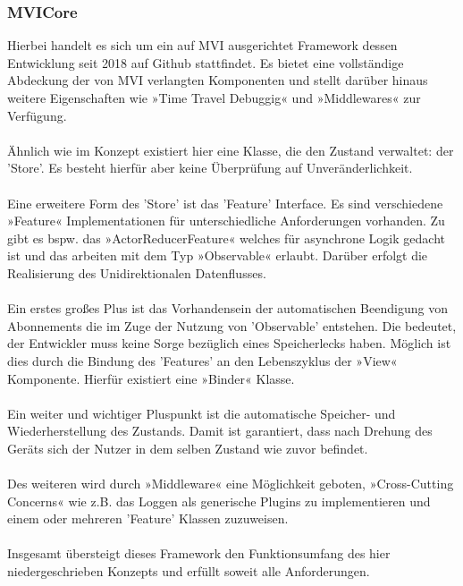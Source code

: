 \subsubsection{MVICore}
\label{subsubsec:mvicore}
Hierbei handelt es sich um ein auf MVI ausgerichtet Framework dessen Entwicklung seit 2018 auf Github stattfindet.
\cite{mviCoreGithub}
Es bietet eine vollständige Abdeckung der von MVI verlangten Komponenten und stellt darüber hinaus weitere Eigenschaften wie »Time Travel Debuggig« und »Middlewares« zur Verfügung.
\\\\
Ähnlich wie im Konzept existiert hier eine Klasse, die den Zustand verwaltet: der 'Store'. Es besteht hierfür aber keine Überprüfung auf Unveränderlichkeit. 
\\\\
Eine erweitere Form des 'Store' ist das 'Feature' Interface. Es sind verschiedene »Feature« Implementationen für unterschiedliche Anforderungen vorhanden. Zu gibt es bspw. das »ActorReducerFeature« welches für asynchrone Logik gedacht ist und das arbeiten mit dem Typ »Observable« erlaubt. Darüber erfolgt die Realisierung des Unidirektionalen Datenflusses.
\\\\
Ein erstes großes Plus ist das Vorhandensein der automatischen Beendigung von Abonnements die im Zuge der Nutzung von 'Observable' entstehen. Die bedeutet, der Entwickler muss keine Sorge bezüglich eines Speicherlecks haben. Möglich ist dies durch die Bindung des 'Features' an den Lebenszyklus der »View« Komponente. Hierfür existiert eine »Binder« Klasse.
\\\\
Ein weiter und wichtiger Pluspunkt ist die automatische Speicher- und Wiederherstellung des Zustands. Damit ist garantiert, dass nach Drehung des Geräts sich der Nutzer in dem selben Zustand wie zuvor befindet.
\\\\
Des weiteren wird durch »Middleware« eine Möglichkeit geboten, »Cross-Cutting Concerns« wie z.B. das Loggen als generische Plugins zu implementieren und einem oder mehreren 'Feature' Klassen zuzuweisen.
\\\\
Insgesamt übersteigt dieses Framework den Funktionsumfang des hier niedergeschrieben Konzepts und erfüllt soweit alle Anforderungen.